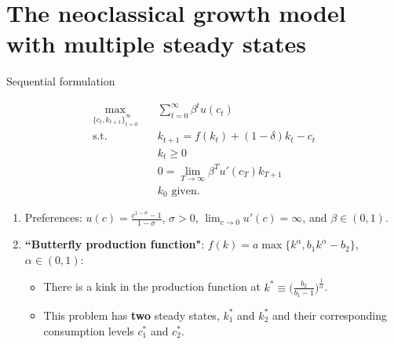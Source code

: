 \documentclass[aspectratio=169,10pt]{beamer}
\newcommand{\emphcolor}[1]{\textbf{\textcolor{emphcolorval}{#1}}}
\newcommand{\st}{\textrm{s.t.}\,}
\begin{document}
\section{The neoclassical growth model with multiple steady states}
\begin{frame}{Sequential formulation}
	
	\begin{align*}
		\max_{\{c_t,k_{t+1}\}_{t=0}^\infty} \quad & \sum_{t=0}^\infty \beta^t u(c_t)                      \\
		\st\quad                                  & k_{t+1} = f(k_t) + (1-\delta)k_t - c_t                \\
		& k_{t}\geq0                                            \\
		\quad                                     & 0 = \lim_{T\rightarrow \infty} \beta^T u'(c_T)k_{T+1} \\
		& k_0  \text{ given.}
	\end{align*}
	\begin{enumerate}
		\item Preferences: $u(c) = \frac{c^{1-\sigma}-1}{1-\sigma}$, $\sigma > 0$, $\lim_{c\rightarrow 0} u'(c) = \infty$, and $\beta \in (0,1)$.			\smallskip
		\item \emphcolor{``Butterfly production function"}: $f(k) = a \max\{k^\alpha, b_1 k^\alpha - b_2\}$, $\alpha \in (0,1)$:
		\smallskip
		\begin{itemize}
			
			\item There is a kink in the production function at $k^* \equiv \big(\frac{b_2}{b_1 -1}\big)^\frac{1}{\alpha} $.			\smallskip
			
			\item This problem has \emphcolor{two} steady states, $k_1^*$ and $k_2^*$ and their corresponding consumption levels $c_1^*$ and $c_2^*$.
		\end{itemize}
	\end{enumerate}
\end{frame}
\end{document}
